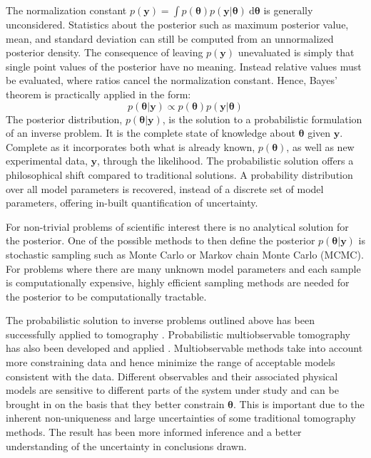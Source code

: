 The normalization constant $p(\bm{y}) = \int p(\bm{\theta}) p(\bm{y}|\bm{\theta})\ \text{d}\bm{\theta}$ is generally unconsidered. Statistics about the posterior such as maximum posterior value, mean, and standard deviation can still be computed from an unnormalized posterior density. The consequence of leaving $p(\bm{y})$ unevaluated is simply that single point values of the posterior have no meaning. Instead relative values must be evaluated, where ratios cancel the normalization constant. Hence, Bayes' theorem is practically applied in the form:
\begin{equation}
p(\bm{\theta}|\bm{y}) \propto p(\bm{\theta}) p(\bm{y}|\bm{\theta})
\label{applied_bayes}	
\end{equation}
The posterior distribution, $p(\bm{\theta}|\bm{y})$, is the solution to a probabilistic formulation of an inverse problem. It is the complete state of knowledge about $\bm{\theta}$ given $\bm{y}$. Complete as it incorporates both what is already known, $p(\bm{\theta})$, as well as new experimental data, $\bm{y}$, through the likelihood. The probabilistic solution offers a philosophical shift compared to traditional solutions. A probability distribution over all model parameters is recovered, instead of a discrete set of model parameters, offering in-built quantification of uncertainty. \par

For non-trivial problems of scientific interest there is no analytical solution for the posterior. One of the possible methods to then define the posterior $p(\bm{\theta}|\bm{y})$ is stochastic sampling such as Monte Carlo or Markov chain Monte Carlo (MCMC). For problems where there are many unknown model parameters and each sample is computationally expensive, highly efficient sampling methods are needed for the posterior to be computationally tractable. \par

The probabilistic solution to inverse problems outlined above has been successfully applied to tomography \citep{Zhao1996,Sambridge1999,Shapiro2002,Trampert2004,Khan2011}. Probabilistic multiobservable tomography has also been developed  and applied \citep{khan2007joint,Moorkamp2010,Bodin2012,Shen2012,afonso2013a,afonso2013b,afonso2016}. Multiobservable methods take into account more constraining data and hence minimize the range of acceptable models consistent with the data. Different observables and their associated physical models are sensitive to different parts of the system under study and can be brought in on the basis that they better constrain $\bm{\theta}$. This is important due to the inherent non-uniqueness and large uncertainties of some traditional tomography methods. The result has been more informed inference and a better understanding of the uncertainty in conclusions drawn.

